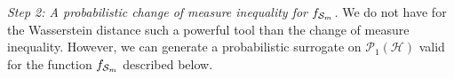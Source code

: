\begin{noaddcontents}
\textit{Step 2: A probabilistic change of measure inequality for $f_{\mathcal{S}_m}$.}
We do not have for the Wasserstein distance such a powerful tool than the change of measure inequality. However, we can generate a probabilistic surrogate on $\mathcal{P}_1(\mathcal{H})$ valid for the function $f_{\mathcal{S}_m}$ described below.



\end{noaddcontents}
